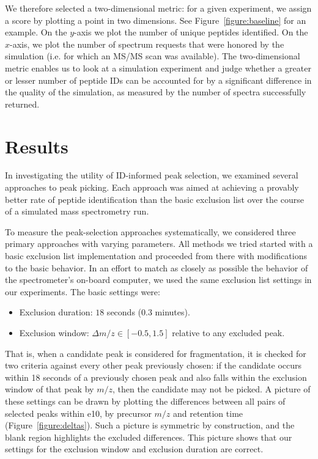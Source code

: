 \documentclass[12pt,twoside,openright]{report}
\begin{document}
We therefore selected a two-dimensional metric: for a given experiment, we
assign a score by plotting a point in two dimensions. See
Figure~\ref{figure:baseline} for an example. On the $y$-axis we plot the number
of unique peptides identified. On the $x$-axis, we plot the number of spectrum
requests that were honored by the simulation (i.e. for which an MS/MS scan was
available). The two-dimensional metric enables us to look at a simulation
experiment and judge whether a greater or lesser number of peptide IDs can be
accounted for by a significant difference in the quality of the simulation, as
measured by the number of spectra successfully returned.

\section{Results} %

In investigating the utility of ID-informed peak selection, we examined several
approaches to peak picking. Each approach was aimed at achieving a provably
better rate of peptide identification than the basic exclusion list over the
course of a simulated mass spectrometry run.

To measure the peak-selection approaches systematically, we considered three
primary approaches with varying parameters. All methods we tried started with a
basic exclusion list implementation and proceeded from there with modifications
to the basic behavior. In an effort to match as closely as possible the behavior
of the spectrometer's on-board computer, we used the same exclusion list
settings in our experiments. The basic settings were:
\begin{itemize}
\item Exclusion duration: $18$ seconds ($0.3$ minutes).
\item Exclusion window: $\Delta m/z \in [-0.5, 1.5]$ relative to any excluded peak.
\end{itemize}
That is, when a candidate peak is considered for fragmentation, it is checked
for two criteria against every other peak previously chosen: if the candidate
occurs within 18 seconds of a previously chosen peak and also falls within the
exclusion window of that peak by $m/z$, then the candidate may not be picked. A
picture of these settings can be drawn by plotting the differences between all
pairs of selected peaks within e10, by precursor $m/z$ and retention time
(Figure~\ref{figure:deltas}). Such a picture is symmetric by construction, and
the blank region highlights the excluded differences. This picture shows that
our settings for the exclusion window and exclusion duration are correct.
\end{document}
